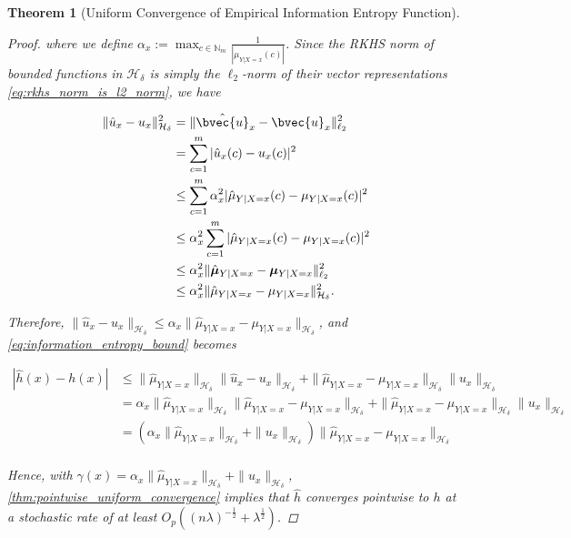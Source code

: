 \documentclass{article}
\newtheorem{theorem}{Theorem}[section]
\begin{document}
\begin{theorem}[Uniform Convergence of Empirical Information Entropy Function]
\begin{proof}
			where we define $\alpha_{x} := \max_{c \in \mathbb{N}_{m}} \frac{1}{| \mu_{Y | X = x}(c) |}$. Since the RKHS norm of bounded functions in $\mathcal{H}_{\delta}$ is simply the $\ell_{2}$-norm of their vector representations \eqref{eq:rkhs_norm_is_l2_norm}, we have
			
			\begin{equation}
			\begin{aligned}
				\| \hat{u}_{x} - u_{x} \|_{\mathcal{H}_{\delta}}^{2} &= \| \hat{\bvec{u}}_{x} - \bvec{u}_{x} \|_{\ell_{2}}^{2} \\
				&= \sum_{c = 1}^{m} | \hat{u}_{x}(c) - u_{x}(c) |^{2} \\
				&\leq \sum_{c = 1}^{m} \alpha_{x}^{2} | \hat{\mu}_{Y | X = x}(c) - \mu_{Y | X = x}(c) |^{2} \\
				&\leq \alpha_{x}^{2} \sum_{c = 1}^{m} | \hat{\mu}_{Y | X = x}(c) - \mu_{Y | X = x}(c) |^{2} \\
				&\leq \alpha_{x}^{2} \| \hat{\bm{\mu}}_{Y | X = x} - \bm{\mu}_{Y | X = x}  \|_{\ell_{2}}^{2} \\
				&\leq \alpha_{x}^{2} \| \hat{\mu}_{Y | X = x} - \mu_{Y | X = x} \|_{\mathcal{H}_{\delta}}^{2}. \\
			\end{aligned}
			\end{equation}
			
			Therefore, $\| \hat{u}_{x} - u_{x} \|_{\mathcal{H}_{\delta}} \leq \alpha_{x} \| \hat{\mu}_{Y | X = x} - \mu_{Y | X = x} \|_{\mathcal{H}_{\delta}}$, and \eqref{eq:information_entropy_bound} becomes
			
			\begin{equation}
			\begin{aligned}
				| \hat{h}(x) - h(x) | &\leq \| \hat{\mu}_{Y | X = x} \|_{\mathcal{H}_{\delta}} \| \hat{u}_{x} - u_{x} \|_{\mathcal{H}_{\delta}} + \| \hat{\mu}_{Y | X = x} - \mu_{Y | X = x} \|_{\mathcal{H}_{\delta}} \| u_{x} \|_{\mathcal{H}_{\delta}} \\
				&= \alpha_{x} \| \hat{\mu}_{Y | X = x} \|_{\mathcal{H}_{\delta}} \| \hat{\mu}_{Y | X = x} - \mu_{Y | X = x} \|_{\mathcal{H}_{\delta}} + \| \hat{\mu}_{Y | X = x} - \mu_{Y | X = x} \|_{\mathcal{H}_{\delta}} \| u_{x} \|_{\mathcal{H}_{\delta}} \\
				&= ( \alpha_{x} \| \hat{\mu}_{Y | X = x} \|_{\mathcal{H}_{\delta}} + \| u_{x} \|_{\mathcal{H}_{\delta}} ) \| \hat{\mu}_{Y | X = x} - \mu_{Y | X = x} \|_{\mathcal{H}_{\delta}} \\
			\end{aligned}
			\end{equation}
			
			Hence, with $\gamma(x) = \alpha_{x} \| \hat{\mu}_{Y | X = x} \|_{\mathcal{H}_{\delta}} + \| u_{x} \|_{\mathcal{H}_{\delta}}$, \cref{thm:pointwise_uniform_convergence} implies that $\hat{h}$ converges pointwise to $h$ at a stochastic rate of at least $O_{p}((n \lambda)^{-\frac{1}{2}} + \lambda^{\frac{1}{2}})$.
		\end{proof}
	\end{theorem}
	
\end{document}
